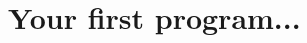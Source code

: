 \documentclass{beamer}
\begin{document}
%
%  
% 
%  
%
% 

\section{Your first program...}

\end{document}

